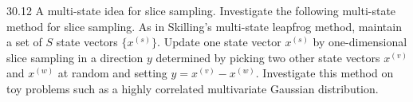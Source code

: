 \documentclass[12pt, a4paper]{article}
\begin{document}
\begin{prob}{30.12}
A multi-state idea for slice sampling. Investigate the following multi-state method for slice sampling. As in Skilling’s multi-state leapfrog method, maintain a set of $S$ state vectors $\{x^{(s)}\}$. Update one state vector $x^{(s)}$ by one-dimensional slice sampling in a direction $y$ determined by picking two other state vectors $x^{(v)}$ and $x^{(w)}$ at random and setting $y = x^{(v)} - x^{(w)}$. Investigate this method on toy problems such as a highly correlated multivariate Gaussian distribution.
\end{prob}
\begin{sol}
\end{sol}
\bigskip
\end{document}
